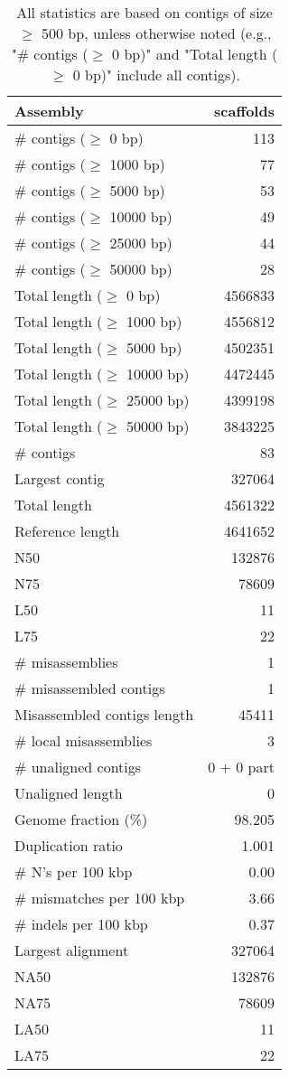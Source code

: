 \documentclass[12pt,a4paper]{article}
\begin{document}
\begin{table}[ht]
\begin{center}
\caption{All statistics are based on contigs of size $\geq$ 500 bp, unless otherwise noted (e.g., "\# contigs ($\geq$ 0 bp)" and "Total length ($\geq$ 0 bp)" include all contigs).}
\begin{tabular}{|l*{1}{|r}|}
\hline
Assembly & scaffolds \\ \hline
\# contigs ($\geq$ 0 bp) & 113 \\ \hline
\# contigs ($\geq$ 1000 bp) & 77 \\ \hline
\# contigs ($\geq$ 5000 bp) & 53 \\ \hline
\# contigs ($\geq$ 10000 bp) & 49 \\ \hline
\# contigs ($\geq$ 25000 bp) & 44 \\ \hline
\# contigs ($\geq$ 50000 bp) & 28 \\ \hline
Total length ($\geq$ 0 bp) & 4566833 \\ \hline
Total length ($\geq$ 1000 bp) & 4556812 \\ \hline
Total length ($\geq$ 5000 bp) & 4502351 \\ \hline
Total length ($\geq$ 10000 bp) & 4472445 \\ \hline
Total length ($\geq$ 25000 bp) & 4399198 \\ \hline
Total length ($\geq$ 50000 bp) & 3843225 \\ \hline
\# contigs & 83 \\ \hline
Largest contig & 327064 \\ \hline
Total length & 4561322 \\ \hline
Reference length & 4641652 \\ \hline
N50 & 132876 \\ \hline
N75 & 78609 \\ \hline
L50 & 11 \\ \hline
L75 & 22 \\ \hline
\# misassemblies & 1 \\ \hline
\# misassembled contigs & 1 \\ \hline
Misassembled contigs length & 45411 \\ \hline
\# local misassemblies & 3 \\ \hline
\# unaligned contigs & 0 + 0 part \\ \hline
Unaligned length & 0 \\ \hline
Genome fraction (\%) & 98.205 \\ \hline
Duplication ratio & 1.001 \\ \hline
\# N's per 100 kbp & 0.00 \\ \hline
\# mismatches per 100 kbp & 3.66 \\ \hline
\# indels per 100 kbp & 0.37 \\ \hline
Largest alignment & 327064 \\ \hline
NA50 & 132876 \\ \hline
NA75 & 78609 \\ \hline
LA50 & 11 \\ \hline
LA75 & 22 \\ \hline
\end{tabular}
\end{center}
\end{table}
\end{document}
